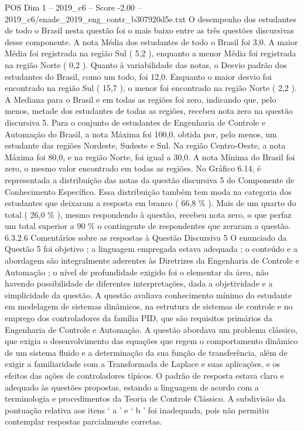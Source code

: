 \begin{textsample}{POS Dim 1 – 2019\_c6 – Score -2.00 – 2019\_c6/enade\_2019\_eng\_contr\_b307920d5e.txt}
O desempenho dos estudantes de todo o Brasil nesta questão foi o mais baixo entre as três questões discursivas desse componente.
A nota Média dos estudantes de todo o Brasil foi 3,0.
A maior Média foi registrada na região Sul ( 5,2 ), enquanto a menor Média foi registrada na região Norte ( 0,2 ).
Quanto à variabilidade das notas, o Desvio padrão dos estudantes do Brasil, como um todo, foi 12,0.
Enquanto o maior desvio foi encontrado na região Sul ( 15,7 ), o menor foi encontrado na região Norte ( 2,2 ).
A Mediana para o Brasil e em todas as regiões foi zero, indicando que, pelo menos, metade dos estudantes de todas as regiões, recebeu nota zero na questão discursiva 5.
Para o conjunto de estudantes de Engenharia de Controle e Automação do Brasil, a nota Máxima foi 100,0, obtida por, pelo menos, um estudante das regiões Nordeste, Sudeste e Sul.
Na região Centro-Oeste, a nota Máxima foi 80,0, e na região Norte, foi igual a 30,0.
A nota Mínima do Brasil foi zero, o mesmo valor encontrado em todas as regiões.
No Gráfico 6.14, é representada a distribuição das notas da questão discursiva 5 do Componente de Conhecimento Específico.
Essa distribuição também tem moda na categoria dos estudantes que deixaram a resposta em branco ( 66,8 \% ).
Mais de um quarto do total ( 26,0 \% ), mesmo respondendo à questão, recebeu nota zero, o que perfaz um total superior a 90 \% o contingente de respondentes que zeraram a questão. 6.3.2.6 Comentários sobre as respostas à Questão Discursiva 5 O enunciado da Questão 5 foi objetivo ; a linguagem empregada estava adequada ; o conteúdo e a abordagem são integralmente aderentes às Diretrizes da Engenharia de Controle e Automação ; o nível de profundidade exigido foi o elementar da área, não havendo possibilidade de diferentes interpretações, dada a objetividade e a simplicidade da questão.
A questão avaliava conhecimento mínimo do estudante em modelagem de sistemas dinâmicos, na estrutura de sistemas de controle e no emprego dos controladores da família PID, que são requisitos primários da Engenharia de Controle e Automação.
A questão abordava um problema clássico, que exigia o desenvolvimento das equações que regem o comportamento dinâmico de um sistema fluido e a determinação da sua função de transferência, além de exigir a familiaridade com a Transformada de Laplace e suas aplicações, e os efeitos das ações de controladores típicos.
O padrão de resposta estava claro e adequado às questões propostas, estando a linguagem de acordo com a terminologia e procedimentos da Teoria de Controle Clássico.
A subdivisão da pontuação relativa aos itens ‘ a ’ e ‘ b ’ foi inadequada, pois não permitiu contemplar respostas parcialmente corretas.

\end{textsample}
